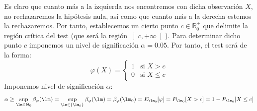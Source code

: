\begin{ejercicio}
\begin{enumerate}[label=\alph*)]
\begin{figure}[H]
            \end{figure}
            Es claro que cuanto más a la izquierda nos encontremos con dicha observación $X$, no rechazaremos la hipótesis nula, así como que cuanto más a la derecha estemos la rechazaremos. Por tanto, establecemos un cierto punto $c\in \mathbb{R}^+_0$ que delimite la región crítica del test (que será la región $\left]c,+\infty\right[$). Para determinar dicho punto $c$ imponemos un nivel de significación $\alpha = 0.05$. Por tanto, el test será de la forma:
            \begin{equation*}
                \varphi(X) = \left\{\begin{array}{ll}
                    1 & \text{si\ } X> c \\
                    0 & \text{si\ } X \leq c
                \end{array}\right. 
            \end{equation*}
            Imponemos nivel de significación $\alpha$:
            \begin{equation*}
                \alpha \geq \sup_{\lm \in \Theta_0}\beta_\varphi(\lm) = \sup_{\lm\in \{\lm_0\}} \beta_\varphi(\lm) = \beta_\varphi(\lm_0) = E_{\lm_0}[\varphi]  = P_{\lm_0}[X>c]  = 1-P_{\lm_0}[X\leq c]
            \end{equation*}


\end{enumerate}
\end{ejercicio}
